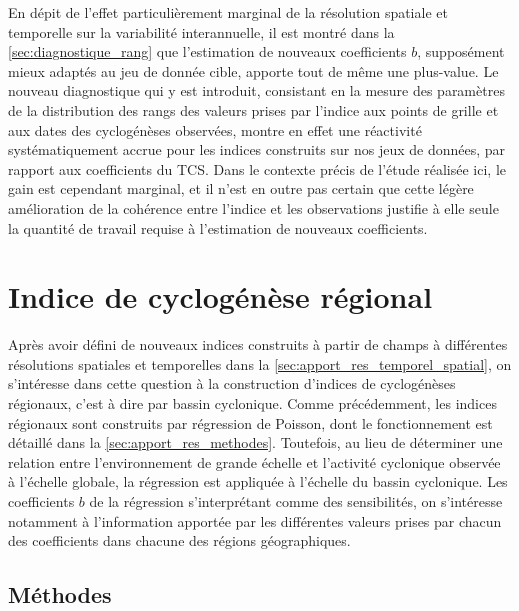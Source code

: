 \documentclass[../main.tex]{subfiles}
\begin{document}
En dépit de l'effet particulièrement marginal de la résolution spatiale et temporelle sur la variabilité interannuelle, il est montré dans la
\cref{sec:diagnostique_rang} que l'estimation de nouveaux coefficients $b$, supposément mieux adaptés au jeu de donnée cible, apporte tout de même une
plus-value. Le nouveau diagnostique qui y est introduit, consistant en la mesure des paramètres de la distribution des rangs des valeurs prises par l'indice aux
points de grille et aux dates des cyclogénèses observées, montre en effet une réactivité systématiquement accrue pour les indices construits sur nos jeux de
données, par rapport aux coefficients du TCS. Dans le contexte précis de l'étude réalisée ici, le gain est cependant marginal, et il n'est en outre pas certain
que cette légère amélioration de la cohérence entre l'indice et les observations justifie à elle seule la quantité de travail requise à l'estimation de nouveaux
coefficients.

\section{Indice de cyclogénèse régional}\label{sec:indice_regional}

Après avoir défini de nouveaux indices construits à partir de champs à différentes résolutions spatiales et temporelles dans la
\cref{sec:apport_res_temporel_spatial}, on s'intéresse dans cette question à la construction d'indices de cyclogénèses régionaux, c'est à dire par bassin
cyclonique. Comme précédemment, les indices régionaux sont construits par régression de Poisson, dont le fonctionnement est détaillé dans la
\cref{sec:apport_res_methodes}. Toutefois, au lieu de déterminer une relation entre l'environnement de grande échelle et l'activité cyclonique observée à
l'échelle globale, la régression est appliquée à l'échelle du bassin cyclonique. Les coefficients $b$ de la régression s'interprétant comme des sensibilités, on
s'intéresse notamment à l'information apportée par les différentes valeurs prises par chacun des coefficients dans chacune des régions géographiques.

\subsection{Méthodes}
\end{document}
